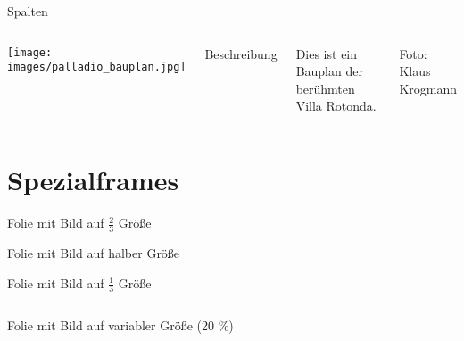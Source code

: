 \documentclass{sdqbeamer}
\begin{document}
\begin{frame}{Spalten}
	\begin{columns}
		\column{\kitfourcolumns}	
			\texttt{[image: images/palladio\_bauplan.jpg]}
		\column{\kittwocolumns}	
			\begin{standardbox}
				Beschreibung
			\end{standardbox}

			\vspace{1em}

			\begin{highlightbox}
				Dies ist ein Bauplan der berühmten Villa Rotonda. 
			\end{highlightbox}

			\vspace{1em}

			\begin{grayhighlightbox}
				Foto: Klaus Krogmann
			\end{grayhighlightbox}
	\end{columns}
\end{frame}

\section{Spezialframes}
\begin{frame}[picture 66 vertical,picture=images/palladio_bauplan,kitlogo=black]{Folie mit Bild auf $\frac{2}{3}$ Größe}
	\lipsum[1][1-8]
\end{frame}

\begin{frame}[picture 50 vertical,picture=images/palladio_bauplan,kitlogo=black]{Folie mit Bild auf halber Größe}
	\lipsum[1][1-16]
\end{frame}

\begin{frame}[picture 33 vertical,picture=images/palladio_bauplan,kitlogo=white]{Folie mit Bild auf $\frac{1}{3}$ Größe}
	\begin{columns}
		\column{\kittwocolumns}	
		\lipsum[1][1-8]
		\column{\kittwocolumns}	
		\lipsum[1][1-8]
	\end{columns}
\end{frame}


\begin{frame}[picture vertical=20,picture=images/palladio_bauplan,kitlogo=white]{Folie mit Bild auf variabler Größe (20 \%)}
	\lipsum[1][1-16]
\end{frame}
\end{document}
